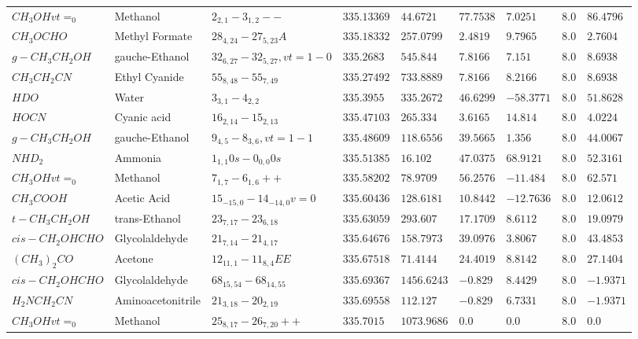 \documentclass[10pt]{article}
\begin{document}
\begin{table}[htb]
\begin{tabular}{l l l l l l l l l}
$CH_{3}OHvt=_{0}$ & Methanol & $2_{2,1}-3_{1,2}--$ & $335.13369$ & $44.6721$ & $77.7538$ & $7.0251$ & $8.0$ & $86.4796$\\
$CH_{3}OCHO$ & Methyl Formate & $28_{4,24}-27_{5,23}A$ & $335.18332$ & $257.0799$ & $2.4819$ & $9.7965$ & $8.0$ & $2.7604$\\
$g-CH_{3}CH_{2}OH$ & gauche-Ethanol & $32_{6,27}-32_{5,27},vt=1-0$ & $335.2683$ & $545.844$ & $7.8166$ & $7.151$ & $8.0$ & $8.6938$\\
$CH_{3}CH_{2}CN$ & Ethyl Cyanide & $55_{8,48}-55_{7,49}$ & $335.27492$ & $733.8889$ & $7.8166$ & $8.2166$ & $8.0$ & $8.6938$\\
$HDO$ & Water & $3_{3,1}-4_{2,2}$ & $335.3955$ & $335.2672$ & $46.6299$ & $-58.3771$ & $8.0$ & $51.8628$\\
$HOCN$ & Cyanic acid & $16_{2,14}-15_{2,13}$ & $335.47103$ & $265.334$ & $3.6165$ & $14.814$ & $8.0$ & $4.0224$\\
$g-CH_{3}CH_{2}OH$ & gauche-Ethanol & $9_{4,5}-8_{3,6},vt=1-1$ & $335.48609$ & $118.6556$ & $39.5665$ & $1.356$ & $8.0$ & $44.0067$\\
$NHD_{2}$ & Ammonia & $1_{1,1}0s-0_{0,0}0s$ & $335.51385$ & $16.102$ & $47.0375$ & $68.9121$ & $8.0$ & $52.3161$\\
$CH_{3}OHvt=_{0}$ & Methanol & $7_{1,7}-6_{1,6}++$ & $335.58202$ & $78.9709$ & $56.2576$ & $-11.484$ & $8.0$ & $62.571$\\
$CH_{3}COOH$ & Acetic Acid & $15_{-15,0}-14_{-14,0}v=0$ & $335.60436$ & $128.6181$ & $10.8442$ & $-12.7636$ & $8.0$ & $12.0612$\\
$t-CH_{3}CH_{2}OH$ & trans-Ethanol & $23_{7,17}-23_{6,18}$ & $335.63059$ & $293.607$ & $17.1709$ & $8.6112$ & $8.0$ & $19.0979$\\
$cis-CH_{2}OHCHO$ & Glycolaldehyde & $21_{7,14}-21_{4,17}$ & $335.64676$ & $158.7973$ & $39.0976$ & $3.8067$ & $8.0$ & $43.4853$\\
$(CH_{3})_{2}CO$ & Acetone & $12_{11,1}-11_{8,4}EE$ & $335.67518$ & $71.4144$ & $24.4019$ & $8.8142$ & $8.0$ & $27.1404$\\
$cis-CH_{2}OHCHO$ & Glycolaldehyde & $68_{15,54}-68_{14,55}$ & $335.69367$ & $1456.6243$ & $-0.829$ & $8.4429$ & $8.0$ & $-1.9371$\\
$H_{2}NCH_{2}CN$ & Aminoacetonitrile & $21_{3,18}-20_{2,19}$ & $335.69558$ & $112.127$ & $-0.829$ & $6.7331$ & $8.0$ & $-1.9371$\\
$CH_{3}OHvt=_{0}$ & Methanol & $25_{8,17}-26_{7,20}++$ & $335.7015$ & $1073.9686$ & $0.0$ & $0.0$ & $8.0$ & $0.0$\\

\end{tabular}
\end{table}
\end{document}
